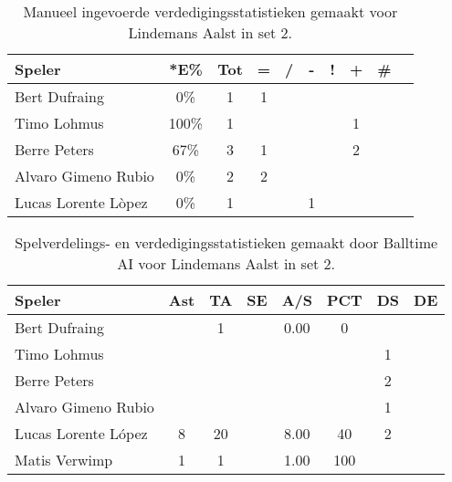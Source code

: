 \begin{table}[ht!]
    \centering
    \scriptsize
    \begin{tabular}{|l|c|c|c|c|c|c|c|c|c|}
        \hline
        \textbf{Speler} & *E\% & Tot & = & / & - & ! & + & \# \\ \hline
        Bert Dufraing & 0\% & 1 & 1 &  &  &  &  & \\ 
        Timo Lohmus & 100\% & 1 &  &  &  &  & 1 & \\ 
        Berre Peters & 67\% & 3 & 1 &  &  &  & 2 & \\ 
        Alvaro Gimeno Rubio & 0\% & 2 & 2 &  &  &  &  & \\ 
        Lucas Lorente Lòpez & 0\% & 1 &  &  & 1 &  &  & \\ \hline
    \end{tabular}
    \caption[Manueel ingevoerde verdedigingsstatistieken gemaakt voor Lindemans Aalst in set 2]{\label{tab:PL3DigAalstMan2}Manueel ingevoerde verdedigingsstatistieken gemaakt voor Lindemans Aalst in set 2.}
\end{table}

\begin{table}[ht!]
  \centering
  \scriptsize
  \begin{tabular}{|l|c|c|c|c|c|c|c|} \hline
    \textbf{Speler} & Ast & TA & SE & A/S & PCT & DS & DE \\ \hline
    Bert Dufraing &  & 1 &  & 0.00 & 0 &  &  \\
    Timo Lohmus &   &   &   &   &   & 1  &   \\
    Berre Peters &   &   &   &   &   &  2 &   \\
    Alvaro Gimeno Rubio &  &  &  &  &   & 1 &   \\
    Lucas Lorente López & 8 & 20 &  & 8.00 & 40 & 2 &  \\
    Matis Verwimp & 1 & 1 &  & 1.00 & 100 &   &   \\ \hline
  \end{tabular}
  \caption[Spelverdelings- en verdedigingsstatistieken gemaakt door Balltime AI voor Lindemans Aalst in set 2]{\label{tab:PL3SetDigAalstAI2}Spelverdelings- en verdedigingsstatistieken gemaakt door Balltime AI voor Lindemans Aalst in set 2.}
\end{table}


